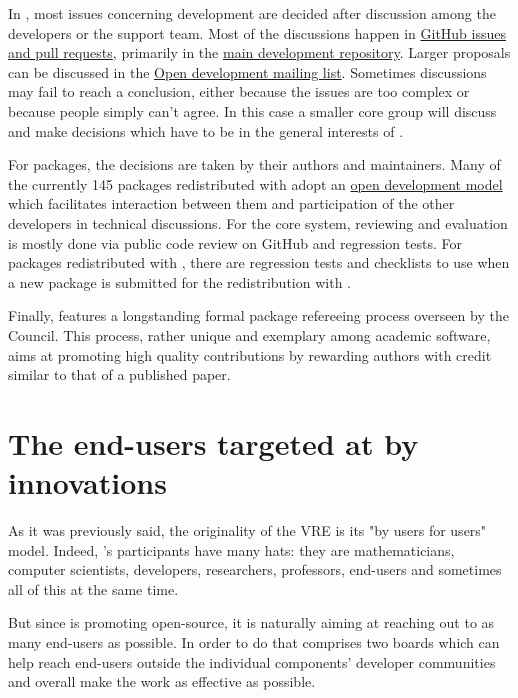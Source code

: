 \documentclass{deliverablereport}
\begin{document}
In \GAP, most issues concerning development are decided after
discussion among the developers or the support team. Most of the
discussions happen in \href{https://github.com/gap-system}{GitHub
  issues and pull requests}, primarily in the
\href{https://github.com/gap-system/gap}{main development repository}.
Larger proposals can be discussed in the
\href{http://mail.gap-system.org/mailman/listinfo/gap}{Open \GAP
  development mailing list}. Sometimes discussions may fail to reach a
conclusion, either because the issues are too complex or because
people simply can’t agree. In this case a smaller core group will
discuss and make decisions which have to be in the general interests
of \GAP.

For \GAP packages, the decisions are taken by their authors and
maintainers. Many of the currently 145 packages redistributed with \GAP
adopt an \href{http://gap-packages.github.io/}{open development model}
which facilitates interaction between them and participation of the
other \GAP developers in technical discussions.  For the
core \GAP system, reviewing and evaluation is mostly done via public
code review on GitHub and regression tests. For \GAP packages
redistributed with \GAP, there are regression tests and checklists to
use when a new package is submitted for the redistribution with \GAP.

Finally, \GAP features a longstanding formal package refereeing process
overseen by the \GAP Council. This process, rather unique and exemplary
among academic software, aims at promoting high quality contributions
by rewarding authors with credit similar to that of a published paper.

\section{The end-users targeted at by innovations}

As it was previously said, the originality of the \ODK VRE is its "by users for
users" model. Indeed, \ODK's participants have many hats: they are
mathematicians, computer scientists, developers, researchers, professors,
end-users and sometimes all of this at the same time.

But since \ODK is promoting open-source, it is naturally aiming at reaching out
to as many end-users as possible. In order to do that \ODK comprises two boards
which can help reach end-users outside the individual components' developer
communities and overall make the \ODK work as effective as possible.
\end{document}
